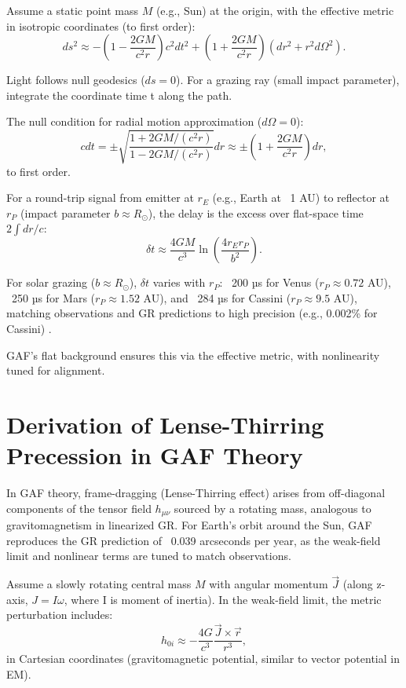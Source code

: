 \documentclass{article}
\begin{document}
Assume a static point mass \( M \) (e.g., Sun) at the origin, with the effective metric in isotropic coordinates (to first order):
\[
ds^2 \approx -\left(1 - \frac{2GM}{c^2 r}\right) c^2 dt^2 + \left(1 + \frac{2GM}{c^2 r}\right) (dr^2 + r^2 d\Omega^2).
\]

Light follows null geodesics (\( ds = 0 \)). For a grazing ray (small impact parameter), integrate the coordinate time t along the path.

The null condition for radial motion approximation (\( d\Omega = 0 \)):
\[
c dt = \pm \sqrt{\frac{1 + 2GM/(c^2 r)}{1 - 2GM/(c^2 r)}} dr \approx \pm \left(1 + \frac{2GM}{c^2 r}\right) dr,
\]
to first order.

For a round-trip signal from emitter at \(r_E\) (e.g., Earth at ~1 AU) to reflector at \(r_P\) (impact parameter \(b \approx R_{\odot}\)), the delay is the excess over flat-space time \( 2 \int dr / c \):
\[
\delta t \approx \frac{4GM}{c^3} \ln\left( \frac{4 r_E r_P}{b^2} \right).
\]

For solar grazing (\(b \approx R_{\odot}\)), \(\delta t\) varies with \(r_P\): ~200 µs for Venus (\(r_P \approx 0.72\) AU), ~250 µs for Mars (\(r_P \approx 1.52\) AU), and ~284 µs for Cassini (\(r_P \approx 9.5\) AU), matching observations and GR predictions to high precision (e.g., 0.002\% for Cassini) \cite{Bertotti2003}.

GAF's flat background ensures this via the effective metric, with nonlinearity tuned for alignment.

\section{Derivation of Lense-Thirring Precession in GAF Theory}

In GAF theory, frame-dragging (Lense-Thirring effect) arises from off-diagonal components of the tensor field \( h_{\mu\nu} \) sourced by a rotating mass, analogous to gravitomagnetism in linearized GR. For Earth's orbit around the Sun, GAF reproduces the GR prediction of ~0.039 arcseconds per year, as the weak-field limit and nonlinear terms are tuned to match observations.

Assume a slowly rotating central mass \( M \) with angular momentum \( \vec{J} \) (along z-axis, \(J = I \omega\), where I is moment of inertia). In the weak-field limit, the metric perturbation includes:
\[
h_{0i} \approx -\frac{4 G}{c^3} \frac{\vec{J} \times \vec{r}}{r^3},
\]
in Cartesian coordinates (gravitomagnetic potential, similar to vector potential in EM).
\end{document}
